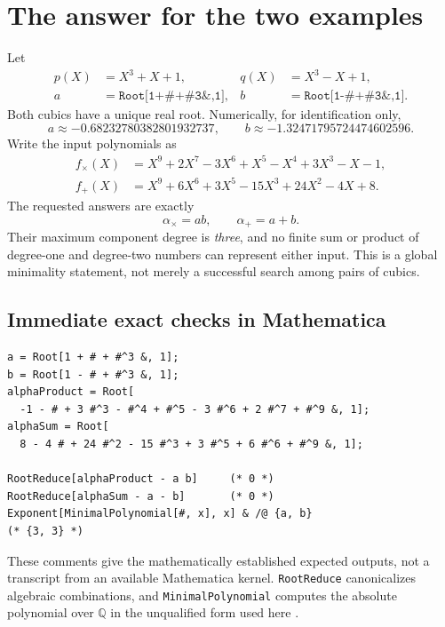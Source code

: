 \documentclass[11pt,a4paper]{article}
\newcommand{\Q}{\mathbb Q}
\newcommand{\code}[1]{\texttt{#1}}
\theoremstyle{remark}\newtheorem{remark}[theorem]{Remark}
\begin{document}
\section{The answer for the two examples}
\label{sec:answer}
Let
\begin{align*}
 p(X)&=X^3+X+1, & q(X)&=X^3-X+1,\\
 a&=\code{Root[1+\#+\#\^{}3\&,1]},&
 b&=\code{Root[1-\#+\#\^{}3\&,1]}.
\end{align*}
Both cubics have a unique real root. Numerically, for identification only,
\[
 a\approx-0.68232780382801932737,\qquad
 b\approx-1.32471795724474602596.
\]
Write the input polynomials as
\begin{align}
 f_\times(X)&=X^9+2X^7-3X^6+X^5-X^4+3X^3-X-1,
 \label{eq:fp}\\
 f_+(X)&=X^9+6X^6+3X^5-15X^3+24X^2-4X+8.
 \label{eq:fs}
\end{align}
The requested answers are exactly
\[
 \boxed{\alpha_\times=ab},\qquad
 \boxed{\alpha_+=a+b}.
\]
Their maximum component degree is \emph{three}, and no finite sum or product of degree-one and degree-two numbers can represent either input. This is a global minimality statement, not merely a successful search among pairs of cubics.

\subsection{Immediate exact checks in Mathematica}
\begin{lstlisting}
a = Root[1 + # + #^3 &, 1];
b = Root[1 - # + #^3 &, 1];
alphaProduct = Root[
  -1 - # + 3 #^3 - #^4 + #^5 - 3 #^6 + 2 #^7 + #^9 &, 1];
alphaSum = Root[
  8 - 4 # + 24 #^2 - 15 #^3 + 3 #^5 + 6 #^6 + #^9 &, 1];

RootReduce[alphaProduct - a b]     (* 0 *)
RootReduce[alphaSum - a - b]       (* 0 *)
Exponent[MinimalPolynomial[#, x], x] & /@ {a, b}
(* {3, 3} *)
\end{lstlisting}
These comments give the mathematically established expected outputs, not a transcript from an available Mathematica kernel. \code{RootReduce} canonicalizes algebraic combinations, and \code{MinimalPolynomial} computes the absolute polynomial over $\Q$ in the unqualified form used here \cite{rootreduce,minpoly}.
\end{document}
